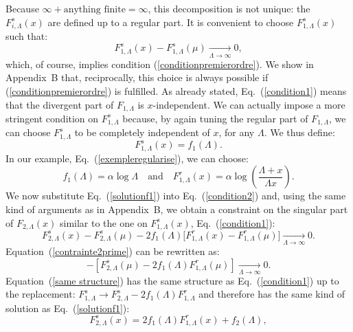 \documentclass[floatfix,preprintnumbers,amsmath,amssymb,prb,12pt]{revtex4-1}
\begin{document}
Because $\infty + \mbox{anything finite} = \infty$,
this decomposition is not unique: the $F_{i,\Lambda}^{s}(x)$ are
defined up to a regular part. It is convenient to choose
$F_{1,\Lambda}^s(x)$ such that:
\begin{equation}
F_{1,\Lambda}^{s}(x)-F_{1,\Lambda}^{s}(\mu)
\underset{\Lambda\to\infty}{\longrightarrow} 0,
\label{condition1}
\end{equation}
which, of course, implies condition (\ref{conditionpremierordre}).
We show in Appendix~B that, reciprocally, this
choice is always possible if (\ref{conditionpremierordre}) is
fulfilled.  As already stated,
Eq.~(\ref{condition1}) means that the divergent part of
$F_{1,\Lambda}$ is $x$-independent. We can actually impose
a more stringent condition on $F_{1,\Lambda}^{s}$ because, by again
tuning the regular part of $F_{1,\Lambda}$, we can choose
$F_{1,\Lambda}^s$ to be completely independent of $x$, for any
$\Lambda$. We thus define:
\begin{equation}
F_{1,\Lambda}^s(x)=f_1(\Lambda).
\label{solutionf1}
\end{equation}
In our example, Eq.~(\ref{exempleregularise}), we can choose:
\begin{equation}
f_1(\Lambda)=\alpha \log \Lambda\quad \mbox{and}\quad
F_{1,\Lambda}^r(x)= \alpha \log (\frac{\Lambda+x}{\Lambda
x}).
\label{solfisfir}
\end{equation}
We now substitute Eq.~(\ref{solutionf1}) into
Eq.~(\ref{condition2}) and, using the same kind of arguments as in
Appendix~B, we obtain a constraint on the singular part of
$F_{2,\Lambda}(x)$ similar to the one on $F_{1,\Lambda}^{s}(x)$,
Eq.~(\ref{condition1}):
\begin{equation}
F_{2,\Lambda}^s(x) -F_{2,\Lambda}^s(\mu) - 2 f_1(\Lambda)
\big[F_{1,\Lambda}^r(x)
-F_{1,\Lambda}^r(\mu)\big]\underset{\Lambda\to\infty}
{\longrightarrow} 0.
\label{contrainte2prime}
\end{equation}
Equation~(\ref{contrainte2prime}) can be rewritten as:
\begin{equation}
[F_{2,\Lambda}^s(x)- 2 f_1(\Lambda) F_{1,\Lambda}^r(x)]
- [F_{2,\Lambda}^s(\mu)- 2 f_1(\Lambda)
F_{1,\Lambda}^r(\mu)]
\underset{\Lambda\to\infty}{\longrightarrow} 0.
\label{same structure}
\end{equation}
Equation~(\ref{same structure}) has the same structure as
Eq.~(\ref{condition1}) up to the replacement: $F_{1,\Lambda}^s\to
F_{2,\Lambda}^s- 2 f_1(\Lambda) F_{1,\Lambda}^r$ and therefore
has the same kind of solution as Eq.~(\ref{solutionf1}):
\begin{equation}
F_{2,\Lambda}^s(x) = 2 f_1(\Lambda) F_{1,\Lambda}^r(x) +
f_2(\Lambda),
\label{last}
\end{equation}
\end{document}
